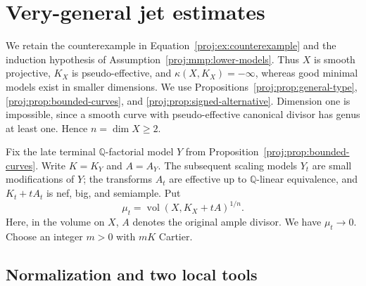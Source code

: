 \documentclass[11pt,letterpaper]{article}
\theoremstyle{definition}
\theoremstyle{remark}
\begin{document}
\section{Very-general jet estimates}\label{proj:sec:jets}

We retain the counterexample in Equation~\eqref{proj:ex:counterexample}
and the induction hypothesis of Assumption~\ref{proj:mmp:lower-models}.
Thus \(X\) is smooth projective,
\(K_X\) is pseudo-effective, and \(\kappa(X,K_X)=-\infty\), whereas
good minimal models exist in smaller dimensions.  We use
Propositions~\ref{proj:prop:general-type}, \ref{proj:prop:bounded-curves}, and
\ref{proj:prop:signed-alternative}.  Dimension one is impossible, since a
smooth curve with pseudo-effective canonical divisor has genus at least
one.  Hence \(n=\dim X\ge2\).

Fix the late terminal \(\mathbb{Q}\)-factorial model \(Y\) from
Proposition~\ref{proj:prop:bounded-curves}.  Write \(K=K_Y\) and \(A=A_Y\).
The subsequent scaling models \(Y_t\) are small modifications of \(Y\);
the transforms \(A_t\) are effective up to \(\mathbb{Q}\)-linear equivalence,
and \(K_t+tA_t\) is nef, big, and semiample.  Put
\[
 \mu_t=\operatorname{vol}(X,K_X+tA)^{1/n}.
\]
Here, in the volume on \(X\), \(A\) denotes the original ample divisor.
We have \(\mu_t\to0\).  Choose an integer \(m>0\) with \(mK\) Cartier.

\subsection{Normalization and two local tools}
\end{document}
